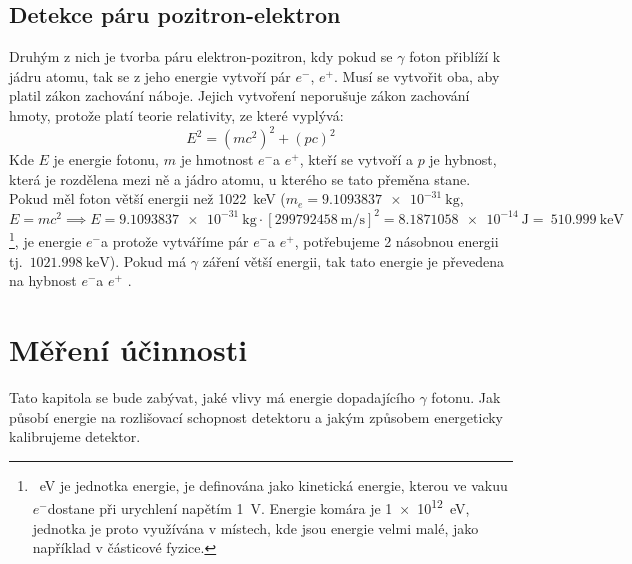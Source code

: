 \documentclass[12pt,a4paper]{article}
\newcommand{\e}{$e^-$}
\begin{document}
\begin{spacing}{1.5}
\subsection{Detekce páru pozitron-elektron}
Druhým z nich je tvorba páru elektron-pozitron, kdy pokud se $\gamma$ foton přiblíží k jádru atomu, tak se z jeho energie vytvoří pár \e, $e^+$. Musí se vytvořit oba, aby platil zákon zachování náboje. Jejich vytvoření neporušuje zákon zachování hmoty, protože platí teorie relativity, \break ze které vyplývá:  
\begin{equation}
	E^2 = (mc^2)^2 + (pc)^2
\end{equation}
Kde $E$ je energie fotonu, $m$ je hmotnost \e a $e^+$, kteří se vytvoří a $p$ je hybnost, která je rozdělena mezi ně a jádro atomu, u kterého se tato přeměna stane. 
Pokud měl foton větší energii než \SI{1022}{\kilo\electronvolt} ($m_{e} = \SI{9.1093837e-31}{\kilogram}$, $E=mc^2 \implies E = \SI{9.1093837e-31}{\kilogram} \cdot [\SI{299792458}{\meter\per\second}]^2 = \SI{8.1871058e-14}{\joule} =~\SI{510.999}{\kilo\electronvolt}$\footnote{\SI{}{\electronvolt} je jednotka energie, je definována jako kinetická energie, kterou ve vakuu \e dostane  při urychlení napětím \SI{1}{\volt}. Energie komára je \SI{1e12}{\electronvolt}, jednotka je proto využívána v místech, kde jsou energie velmi malé, jako například v částicové fyzice.}, je energie \e a protože vytváříme pár \e a $e^+$, potřebujeme 2 násobnou energii tj.~$\SI{1021.998}{\kilo\electronvolt}$).\enlargethispage{\baselineskip} Pokud má $\gamma$ záření větší energii, tak tato energie je převedena na hybnost \e a $e^+$ \cite{semiconductors,libretext_pair}. %
\section{Měření účinnosti}%
Tato kapitola se bude zabývat, jaké vlivy má energie dopadajícího $\gamma$ fotonu. Jak působí energie na rozlišovací schopnost detektoru a jakým způsobem energeticky kalibrujeme detektor. 

\end{spacing}
\end{document}
